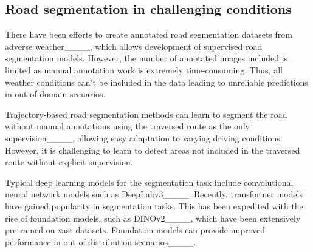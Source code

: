 

\subsection{Road segmentation in challenging conditions}

There have been efforts to create annotated road segmentation datasets from adverse weather____, which allows development of supervised road segmentation models. However, the number of annotated images included is limited as manual annotation work is extremely time-consuming. Thus, all weather conditions can't be included in the data leading to unreliable predictions in out-of-domain scenarios. 

Trajectory-based road segmentation methods can learn to segment the road without manual annotations using the traversed route as the only supervision____, allowing easy adaptation to varying driving conditions. However, it is challenging to learn to detect areas not included in the traversed route without explicit supervision. 

Typical deep learning models for the segmentation task include convolutional neural network models such as DeepLabv3____. Recently, transformer models have gained popularity in segmentation tasks. This has been expedited with the rise of foundation models, such as DINOv2____, which have been extensively pretrained on vast datasets. Foundation models can provide improved performance in out-of-distribution scenarios____.

